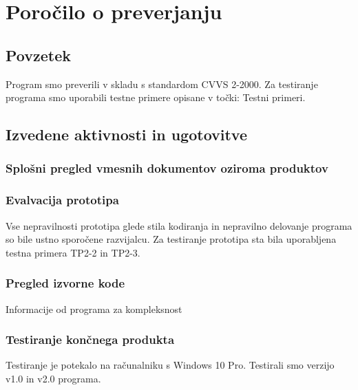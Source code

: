 \documentclass[a4paper,12pt]{article}
\begin{document}
\newpage

\section{Poročilo o preverjanju}

	\subsection{Povzetek}

	\qquad Program smo preverili v skladu s standardom CVVS 2-2000. Za testiranje 
			programa smo uporabili testne primere opisane v točki: Testni primeri.

	\subsection{Izvedene aktivnosti in ugotovitve}
	
		\subsubsection{Splošni pregled vmesnih dokumentov oziroma produktov}
		
		\subsubsection{Evalvacija prototipa}

		\qquad Vse nepravilnosti prototipa glede stila kodiranja in nepravilno 
				delovanje programa so bile ustno sporočene razvijalcu. Za testiranje
				prototipa sta bila uporabljena testna primera TP2-2 in TP2-3.
		
		\subsubsection{Pregled izvorne kode}
	
		\qquad Informacije od programa za kompleksnost

		\subsubsection{Testiranje končnega produkta}

		\qquad Testiranje je potekalo na računalniku s Windows 10 Pro. Testirali smo 
		verzijo v1.0 in v2.0 programa.

		\vspace{0.5cm}

		\hspace{-0.8cm}  
\end{document}

